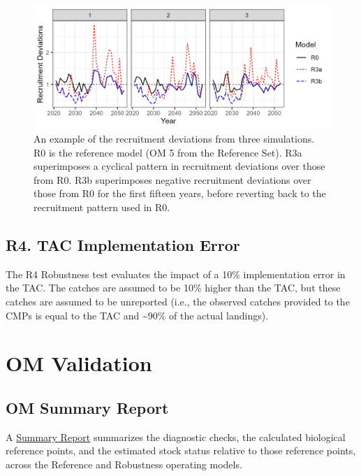 \documentclass[
]{article}
\begin{document}
\begin{figure}
\includegraphics[width=25in]{../../img/R3/RecDevs} \caption{An example of the recruitment deviations from three simulations. R0 is the reference model (OM 5 from the Reference Set). R3a superimposes a cyclical pattern in recruitment deviations over those from R0. R3b superimposes negative recruitment deviations over those from R0 for the first fifteen years, before reverting back to the recruitment pattern used in R0.}\label{fig:r3-2}
\end{figure}

\hypertarget{r4.-tac-implementation-error}{%
\subsection{R4. TAC Implementation Error}\label{r4.-tac-implementation-error}}

The R4 Robustness test evaluates the impact of a 10\% implementation error in the TAC. The catches are assumed to be 10\% higher than the TAC, but these catches are assumed to be unreported (i.e., the observed catches provided to the CMPs is equal to the TAC and \textasciitilde90\% of the actual landings).

\hypertarget{om-validation}{%
\section{OM Validation}\label{om-validation}}

\hypertarget{om-summary-report}{%
\subsection{OM Summary Report}\label{om-summary-report}}

A \href{../Reports/OM_Summary/2023/OM_Summary_Report.html}{Summary Report} summarizes the diagnostic checks, the calculated biological reference points, and the estimated stock status relative to those reference points, across the Reference and Robustness operating models.
\end{document}
